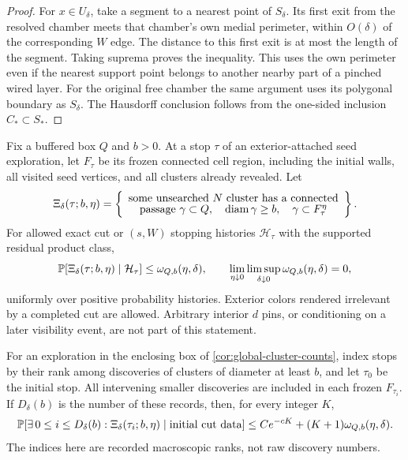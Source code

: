 \begin{proof}
For $x\in U_\delta$, take a segment to a nearest point of
$S_\delta$. Its first exit from the resolved chamber meets that
chamber's own medial perimeter, within $O(\delta)$ of the
corresponding $W$ edge. The distance to this first exit is at most
the length of the segment. Taking suprema proves the inequality.
This uses the own perimeter even if the nearest support point
belongs to another nearby part of a pinched wired layer. For the
original free chamber the same argument uses its polygonal boundary
as $S_\delta$. The Hausdorff conclusion follows from the one-sided
inclusion $C_*\subset S_*$.
\end{proof}

\begin{corollary}
\label{cor:indexed-no-shadowing}
Fix a buffered box $Q$ and $b>0$. At a stop $\tau$ of an
exterior-attached seed exploration, let $F_\tau$ be its frozen
connected cell region, including the initial walls, all visited seed
vertices, and all clusters already revealed. Let
\[
 \Xi_\delta(\tau;b,\eta)
  =\left\{\begin{array}{c}
   \text{some unsearched }N\text{ cluster has a connected}\\[-2pt]
   \text{passage }\gamma\subset Q,\quad \diam\gamma\ge b,\quad
              \gamma\subset F_\tau^\eta
          \end{array}\right\}.
\]
For allowed exact cut or $(s,W)$ stopping histories $\mathcal H_\tau$
with the supported residual product class,
\begin{equation}\label{eq:spatial-frozen-shadow}
 \P[\Xi_\delta(\tau;b,\eta)\mid\mathcal H_\tau]
       \le\omega_{Q,b}(\eta,\delta),\qquad
 \lim_{\eta\downarrow0}\limsup_{\delta\downarrow0}
       \omega_{Q,b}(\eta,\delta)=0,
\end{equation}
uniformly over positive probability histories. Exterior colors
rendered irrelevant by a completed cut are allowed. Arbitrary
interior $d$ pins, or conditioning on a later visibility event,
are not part of this statement.

For an exploration in the enclosing box of
\cref{cor:global-cluster-counts}, index stops by their rank among
discoveries of clusters of diameter at least $b$, and let
$\tau_0$ be the initial stop. All intervening smaller discoveries
are included in each frozen $F_{\tau_i}$. If $D_\delta(b)$ is the
number of these records, then, for every integer $K$,
\begin{equation}\label{eq:spatial-indexed-shadow}
 \P[\exists\,0\le i\le D_\delta(b):
             \Xi_\delta(\tau_i;b,\eta)
       \mid\text{initial cut data}]
 \le C e^{-cK}+(K+1)\omega_{Q,b}(\eta,\delta).
\end{equation}
The indices here are recorded macroscopic ranks, not raw discovery
numbers.


\end{corollary}
